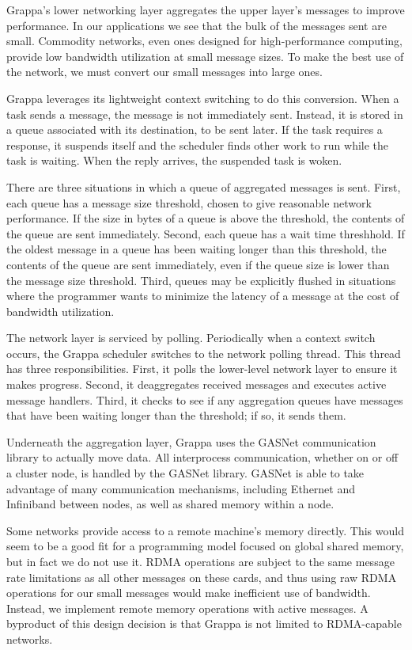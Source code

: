Grappa's lower networking layer aggregates the upper layer's messages
to improve performance. In our applications we see that the bulk of
the messages sent are small.  Commodity networks,
even ones designed for high-performance computing, provide low
bandwidth utilization at small message sizes.  To
make the best use of the network, we must convert our small messages
into large ones.

Grappa leverages its lightweight context switching to do this
conversion. When a task sends a message, the message is not
immediately sent. Instead, it is stored in a queue associated with its
destination, to be sent later. If the task requires a response, it
suspends itself and the scheduler finds other work to run while the
task is waiting. When the reply arrives, the suspended task is woken.

There are three situations in which a queue of aggregated messages is
sent. First, each queue has a message size threshold, chosen to give
reasonable network performance. If the size in bytes of a queue is
above the threshold, the contents of the queue are sent
immediately. Second, each queue has a wait time threshhold. If the
oldest message in a queue has been waiting longer than this threshold,
the contents of the queue are sent immediately, even if the queue size
is lower than the message size threshold.  Third, queues may be
explicitly flushed in situations where the programmer wants to
minimize the latency of a message at the cost of bandwidth
utilization.

The network layer is serviced by polling. Periodically when a context
switch occurs, the Grappa scheduler switches to the network polling
thread. This thread has three responsibilities. First, it polls the
lower-level network layer to ensure it makes progress. Second, it
deaggregates received messages and executes active message
handlers. Third, it checks to see if any aggregation queues have
messages that have been waiting longer than the threshold; if so, it
sends them.

Underneath the aggregation layer, Grappa uses the GASNet communication
library  to actually move data. All interprocess
communication, whether on or off a cluster node, is handled by the
GASNet library. GASNet is able to take advantage of many communication
mechanisms, including Ethernet and Infiniband between nodes, as well as
shared memory within a node.

Some networks provide access to a remote machine's memory
directly. This would seem to be a good fit for a programming model
focused on global shared memory, but in fact we do not use it. RDMA
operations are subject to the same message rate limitations as all
other messages on these cards, and thus using raw RDMA operations for
our small messages would make inefficient use of bandwidth. Instead,
we implement remote memory operations with active messages. A byproduct of this design decision is that Grappa is not limited
to RDMA-capable networks.
